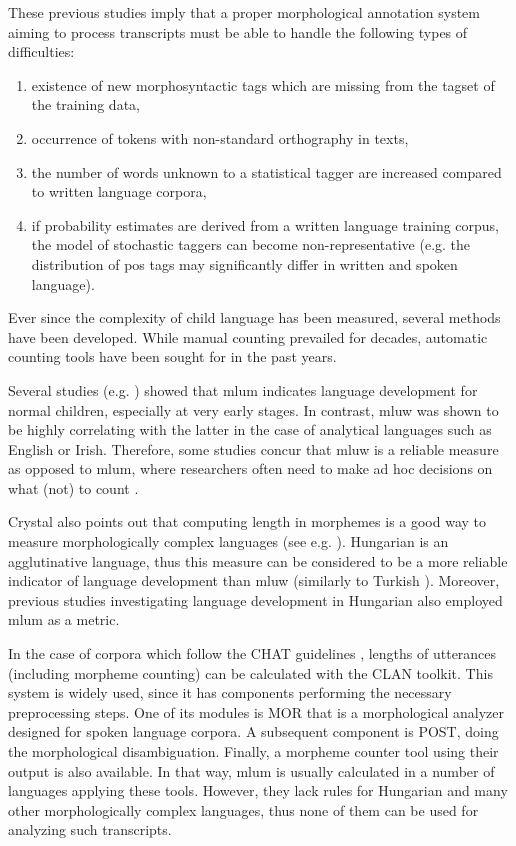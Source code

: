 These previous studies imply that a proper morphological annotation system aiming to process transcripts must be able to handle the following types of difficulties:
\begin{enumerate}
 \item existence of new morphosyntactic tags which are missing from the tagset of the training data,
 \item occurrence of tokens with non-standard orthography in texts,
 \item the number of words unknown to a statistical tagger are increased compared to written language corpora,
 \item if probability estimates are derived from a written language training corpus, the model of stochastic taggers can become non-representative (e.g. the distribution of \acrshort{pos} tags may significantly differ in written and spoken language).
\end{enumerate}

Ever since the complexity of child language has been measured, several methods have been developed. While manual counting prevailed for decades, automatic counting tools have been sought for in the past years.

Several studies (e.g. \cite{Brown1973}) showed that \acrshort{mlum} indicates language development for normal children, especially at very early stages. 
In contrast, \gls{mluw} was shown to be highly correlating \cite{Hickey1991,Parker2005} with the latter in the case of analytical languages such as English or Irish. 
Therefore, some studies concur that \acrshort{mluw} is a reliable measure as opposed to \acrshort{mlum}, where researchers often need to make ad hoc decisions on what (not) to count \cite{Crystal1974}. 

Crystal also points out \cite{Crystal1974} that computing length in morphemes is a good way to measure morphologically complex languages (see e.g. \cite{Bowerman1973}). 
Hungarian is an agglutinative language, thus this measure can be considered to be a more reliable indicator of language development  than \acrshort{mluw} (similarly to Turkish \cite{saygin2010}). 
Moreover, previous studies investigating language development in Hungarian \cite{Reger1990,Weber2011} also employed \acrshort{mlum} as a metric.

In the case of corpora which follow the CHAT guidelines \cite{macwhinney1991childes}, lengths of utterances (including morpheme counting) can be calculated with the CLAN \cite{MacWhinney1992} toolkit. 
This system is widely used, since it has components performing the necessary preprocessing steps. 
One of its modules is MOR that is a morphological analyzer designed for spoken language corpora. 
A subsequent component is POST, doing the morphological disambiguation. 
Finally, a morpheme counter tool using their output is also available. 
In that way, \acrshort{mlum} is usually calculated in a number of languages applying these tools.
However, they lack rules for Hungarian and many other morphologically complex languages, thus none of them can be used for analyzing such transcripts.

